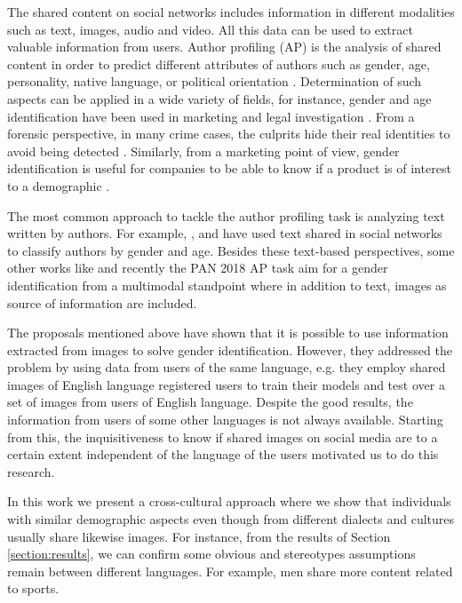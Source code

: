 \documentclass[runningheads]{llncs}
\begin{document}
The shared content on social networks includes information in different modalities such as text, images, audio and video.
All this data can be used to extract valuable information from users.
Author profiling (AP) is the analysis of shared content in order to predict different attributes of authors such as gender, age, personality, native language, or political orientation \cite{rangel_rosso_montes-y-gomez_potthast_stein}.
Determination of such aspects can be applied in a wide variety of fields, for instance, gender and age identification have been
used in marketing and legal investigation \cite{miller_dickinson_hu_2012}. From a forensic perspective, in many crime 
cases, the culprits hide their real identities to avoid being detected \cite{cheng_chandramouli_subbalakshmi_2011}. Similarly, from
a marketing point of view, gender identification is useful
for companies to be able to know if a product is of interest
to a demographic \cite{rangel2013use}.

The most common approach to tackle the author profiling task
is analyzing text written by authors. 
For example, \cite{cheng_chandramouli_subbalakshmi_2011}, \cite{FATIMA2017886} and \cite{gomez2016improving}
have used text shared in social networks to 
classify authors by gender and age.
Besides these text-based perspectives,
some other works like \cite{merler2015you} and 
recently the PAN 2018 AP task \cite{rangel_rosso_montes-y-gomez_potthast_stein}  aim
for a gender identification from a multimodal standpoint
where in addition to text, images as source of information
are included.

The proposals mentioned above have shown that it is possible to use information extracted from images to solve gender identification. However, they addressed the problem by using data from users of the same language, e.g. they employ shared images of English language registered users to train their models and test over a set of images from users of English language. Despite the good results, 
the information from users of some other languages is not always available.
Starting from this, the inquisitiveness to know if shared images on social media are to a certain extent independent of the language of the users motivated us to do this research.

In this work we present a cross-cultural approach where we show that individuals with similar demographic aspects even though from different dialects and cultures usually share likewise images.
For instance, from the results of Section \ref{section:results},
we can confirm some obvious and stereotypes assumptions remain
between different languages. For example, men share more content related to sports.
\end{document}
